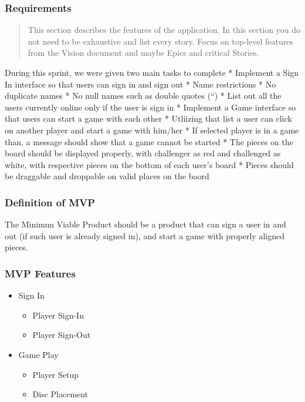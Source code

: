 \documentclass[]{article}
\providecommand{\tightlist}{%
  \setlength{\itemsep}{0pt}\setlength{\parskip}{0pt}}
\begin{document}
\subsubsection{Requirements}\label{requirements}

\begin{quote}
This section describes the features of the application. In this section
you do not need to be exhaustive and list every story. Focus on
top-level features from the Vision document and maybe Epics and critical
Stories.
\end{quote}

During this sprint, we were given two main tasks to complete * Implement
a Sign In interface so that users can sign in and sign out * Name
restrictions * No duplicate names * No null names such as double quotes
(``) * List out all the users currently online only if the user is sign
in * Implement a Game interface so that users can start a game with each
other * Utliizing that list a user can click on another player and start
a game with him/her * If selected player is in a game than, a message
should show that a game cannot be started * The pieces on the board
should be displayed properly, with challenger as red and challenged as
white, with respective pieces on the bottom of each user's board *
Pieces should be draggable and droppable on valid places on the baord

\subsubsection{Definition of MVP}\label{definition-of-mvp}

The Minimun Viable Product should be a product that can sign a user in
and out (if such user is already signed in), and start a game with
properly aligned pieces.

\subsubsection{MVP Features}\label{mvp-features}

\begin{itemize}
\tightlist
\item
  Sign In

  \begin{itemize}
  \tightlist
  \item
    Player Sign-In
  \item
    Player Sign-Out
  \end{itemize}
\item
  Game Play

  \begin{itemize}
  \tightlist
  \item
    Player Setup
  \item
    Disc Placement
  \end{itemize}
\end{itemize}
\end{document}
